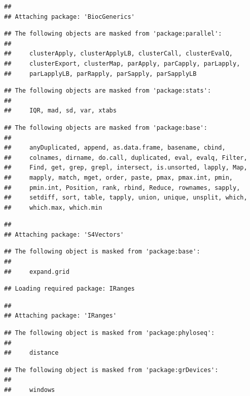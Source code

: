 \documentclass[]{article}
\begin{document}
\begin{verbatim}
## 
## Attaching package: 'BiocGenerics'
\end{verbatim}

\begin{verbatim}
## The following objects are masked from 'package:parallel':
## 
##     clusterApply, clusterApplyLB, clusterCall, clusterEvalQ,
##     clusterExport, clusterMap, parApply, parCapply, parLapply,
##     parLapplyLB, parRapply, parSapply, parSapplyLB
\end{verbatim}

\begin{verbatim}
## The following objects are masked from 'package:stats':
## 
##     IQR, mad, sd, var, xtabs
\end{verbatim}

\begin{verbatim}
## The following objects are masked from 'package:base':
## 
##     anyDuplicated, append, as.data.frame, basename, cbind,
##     colnames, dirname, do.call, duplicated, eval, evalq, Filter,
##     Find, get, grep, grepl, intersect, is.unsorted, lapply, Map,
##     mapply, match, mget, order, paste, pmax, pmax.int, pmin,
##     pmin.int, Position, rank, rbind, Reduce, rownames, sapply,
##     setdiff, sort, table, tapply, union, unique, unsplit, which,
##     which.max, which.min
\end{verbatim}

\begin{verbatim}
## 
## Attaching package: 'S4Vectors'
\end{verbatim}

\begin{verbatim}
## The following object is masked from 'package:base':
## 
##     expand.grid
\end{verbatim}

\begin{verbatim}
## Loading required package: IRanges
\end{verbatim}

\begin{verbatim}
## 
## Attaching package: 'IRanges'
\end{verbatim}

\begin{verbatim}
## The following object is masked from 'package:phyloseq':
## 
##     distance
\end{verbatim}

\begin{verbatim}
## The following object is masked from 'package:grDevices':
## 
##     windows
\end{verbatim}
\end{document}
